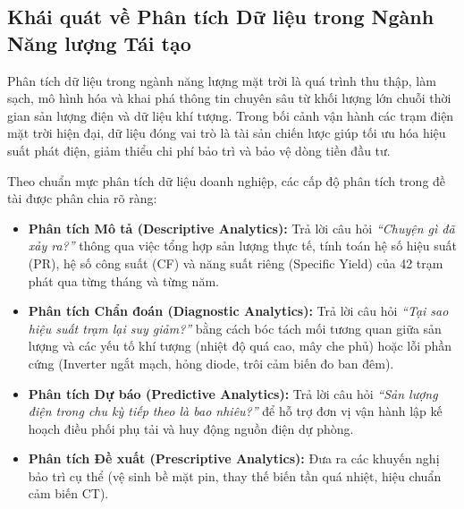 \documentclass[12pt, a4paper]{report}
\begin{document}
\subsection{Khái quát về Phân tích Dữ liệu trong Ngành Năng lượng Tái tạo}
Phân tích dữ liệu trong ngành năng lượng mặt trời là quá trình thu thập, làm sạch, mô hình hóa và khai phá thông tin chuyên sâu từ khối lượng lớn chuỗi thời gian sản lượng điện và dữ liệu khí tượng. Trong bối cảnh vận hành các trạm điện mặt trời hiện đại, dữ liệu đóng vai trò là tài sản chiến lược giúp tối ưu hóa hiệu suất phát điện, giảm thiểu chi phí bảo trì và bảo vệ dòng tiền đầu tư.

Theo chuẩn mực phân tích dữ liệu doanh nghiệp, các cấp độ phân tích trong đề tài được phân chia rõ ràng:
\begin{itemize}[noitemsep]
    \item \textbf{Phân tích Mô tả (Descriptive Analytics):} Trả lời câu hỏi \textit{``Chuyện gì đã xảy ra?''} thông qua việc tổng hợp sản lượng thực tế, tính toán hệ số hiệu suất (PR), hệ số công suất (CF) và năng suất riêng (Specific Yield) của 42 trạm phát qua từng tháng và từng năm.
    \item \textbf{Phân tích Chẩn đoán (Diagnostic Analytics):} Trả lời câu hỏi \textit{``Tại sao hiệu suất trạm lại suy giảm?''} bằng cách bóc tách mối tương quan giữa sản lượng và các yếu tố khí tượng (nhiệt độ quá cao, mây che phủ) hoặc lỗi phần cứng (Inverter ngắt mạch, hỏng diode, trôi cảm biến đo ban đêm).
    \item \textbf{Phân tích Dự báo (Predictive Analytics):} Trả lời câu hỏi \textit{``Sản lượng điện trong chu kỳ tiếp theo là bao nhiêu?''} để hỗ trợ đơn vị vận hành lập kế hoạch điều phối phụ tải và huy động nguồn điện dự phòng.
    \item \textbf{Phân tích Đề xuất (Prescriptive Analytics):} Đưa ra các khuyến nghị bảo trì cụ thể (vệ sinh bề mặt pin, thay thế biến tần quá nhiệt, hiệu chuẩn cảm biến CT).
\end{itemize}
\end{document}
